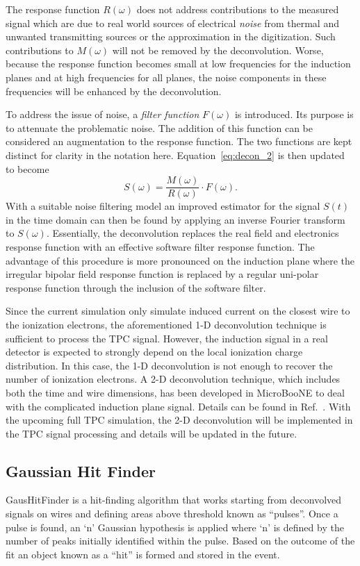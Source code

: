 The response function $R(\omega)$ does not address
contributions to the measured signal which are due to real world
sources of electrical \textit{noise} from thermal and unwanted transmitting
sources or the approximation in the digitization.
Such contributions to $M(\omega)$ will not be removed by the deconvolution.
Worse, because the response function becomes small at low 
frequencies for the induction planes and at high frequencies for all
planes, the noise components in these frequencies will be
enhanced by the deconvolution.

To address the issue of noise, a \textit{filter function} $F(\omega)$ is
introduced.  Its purpose is to attenuate the problematic noise.  The
addition of this function can be considered an augmentation to the
response function.  
The two functions are kept distinct for clarity in the notation here.
Equation~\eqref{eq:decon_2} is then updated to become
\begin{equation}\label{eq:decon_filt}
S(\omega) = \frac{M(\omega)}{R(\omega)} \cdot F(\omega).
\end{equation}
With a suitable noise filtering model an improved estimator for the signal
$S(t)$ in the time domain can then be found by applying an inverse Fourier 
transform to $S(\omega)$.  Essentially, the deconvolution replaces the real field and 
electronics response function with an effective software filter response function. The 
advantage of this procedure is more pronounced on the induction plane where the irregular bipolar field response function is replaced by a regular uni-polar response function through the inclusion of the software filter. 

Since the current simulation only simulate induced current on the closest 
wire to the ionization electrons, the aforementioned 1-D deconvolution 
technique is sufficient to process the TPC signal. However, the induction 
signal in a real detector is expected to strongly depend on the local ionization charge distribution. In this case, the 1-D deconvolution is not 
enough to recover the number of ionization electrons. A 2-D deconvolution
technique, which includes both the time and wire dimensions, has been 
developed in MicroBooNE to deal with the complicated induction plane signal. Details can be found in Ref.~\cite{ref:uboone_signal_processing}. With the upcoming full TPC simulation, the 2-D deconvolution will be implemented 
in the TPC signal processing and details will be updated in the future.


\subsection{Gaussian Hit Finder}
GausHitFinder is a hit-finding algorithm that works starting from deconvolved signals on wires and defining areas above threshold known as ``pulses''. Once a pulse is found, an `n' Gaussian hypothesis is applied where `n' is defined by the number of peaks initially identified within the pulse. Based on the outcome of the fit an object known as a ``hit'' is formed and stored in the event.

